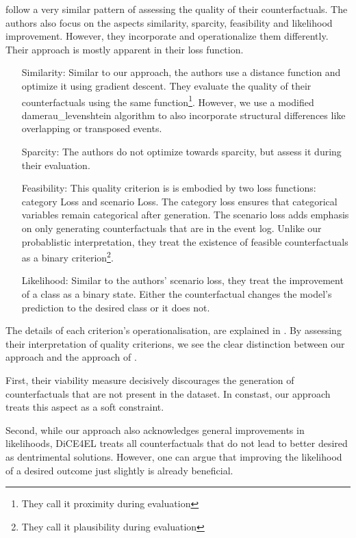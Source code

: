 \documentclass[./../../paper.tex]{subfiles}
\begin{document}
\citeauthor{hsieh_DiCE4ELInterpretingProcess_2021} follow a very similar pattern of assessing the quality of their counterfactuals. The authors also focus on the aspects similarity, sparcity, feasibility and likelihood improvement. However, they incorporate and operationalize them differently. Their approach is mostly apparent in their loss function.

\begin{itemize}
    \item[Similarity:] Similar to our approach, the authors use a distance function and optimize it using gradient descent. They evaluate the quality of their counterfactuals using the same function\footnote{They call it proximity during evaluation}. However, we use a modified \gls{damerau_levenshtein} algorithm to also incorporate structural differences like overlapping or transposed events.      
    \item[Sparcity:] The authors do not optimize towards sparcity, but assess it during their evaluation. 
    \item[Feasibility:] This quality criterion is is embodied by two loss functions: category Loss and scenario Loss. The category loss ensures that categorical variables remain categorical after generation. The scenario loss adds emphasis on only generating counterfactuals that are in the event log. Unlike our probablistic interpretation, they treat the existence of feasible counterfactuals as a binary criterion\footnote{They call it plausibility during evaluation}.   
    \item[Likelihood:] Similar to the authors' scenario loss, they treat the improvement of a class as a binary state. Either the counterfactual changes the model's prediction to the desired class or it does not.
\end{itemize}

The details of each criterion's operationalisation, are explained in \autocite{hsieh_DiCE4ELInterpretingProcess_2021}. By assessing their interpretation of quality criterions, we see the clear distinction between our approach and the approach of \citeauthor{hsieh_DiCE4ELInterpretingProcess_2021}. 

First, their viability measure decisively discourages the generation of counterfactuals that are not present in the dataset. In constast, our approach treats this aspect as a soft constraint. 

Second, while our approach also acknowledges general improvements in likelihoods, DiCE4EL treats all counterfactuals that do not lead to better desired as dentrimental solutions. However, one can argue that improving the likelihood of a desired outcome just slightly is already beneficial.
\end{document}
